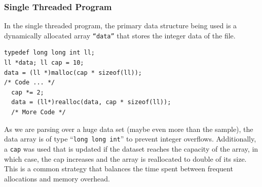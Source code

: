 \documentclass{article}
\theoremstyle{mytheoremstyle}
\theoremstyle{mytheoremstyle}
\theoremstyle{myproblemstyle}
\begin{document}
\subsubsection*{Single Threaded Program}
In the single threaded program, the primary data structure being used is a dynamically allocated array \texttt{``data''} that stores the integer data of the file.
\begin{lstlisting}[caption={Dynamic Data Array}]
typedef long long int ll;
ll *data; ll cap = 10;
data = (ll *)malloc(cap * sizeof(ll));
/* Code ... */
  cap *= 2;
  data = (ll*)realloc(data, cap * sizeof(ll));
  /* More Code */
\end{lstlisting}
As we are parsing over a huge data set (maybe even more than the sample), the data array is of type ``\texttt{long long int}'' to prevent integer overflows. Additionally, a \texttt{cap} was used that is updated if the dataset reaches the capacity of the array, in which case, the cap increases and the array is reallocated to double of its size. This is a common strategy that balances the time spent between frequent allocations and memory overhead.
\end{document}

